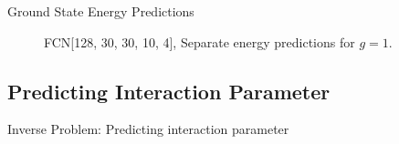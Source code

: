 \documentclass{beamer}
\begin{document}
\begin{frame}{Ground State Energy Predictions}

\begin{figure}[H]
    \centering
    \begin{subfigure}[t]{0.45\textwidth}
		\centering
        
		\label{fig:a}
    \end{subfigure}
    \begin{subfigure}[t]{0.45\textwidth}
		\centering
        
		\label{fig:b}
    \end{subfigure}    
    \begin{subfigure}[t]{0.45\textwidth}
        \centering
        
		\label{fig:c}
    \end{subfigure}
    \begin{subfigure}[t]{0.45\textwidth}
        \centering
        
		\label{fig:c}
    \end{subfigure}
	\caption{FCN[128, 30, 30, 10, 4], Separate energy predictions for $g = 1$.}
\label{fig:FFN-g-1-S}
\end{figure}
\end{frame}

\subsection{Predicting Interaction Parameter}
\begin{frame}{Inverse Problem: Predicting interaction parameter}

\begin{figure}[H]
    \centering
    \begin{subfigure}[t]{0.45\textwidth}
		\centering
    	
		\label{fig:a}
    \end{subfigure}
    \begin{subfigure}[t]{0.45\textwidth}
        \centering
    	
		\label{fig:b}
    \end{subfigure}
    \begin{subfigure}[t]{0.45\textwidth}
        \centering
		
		\label{fig:c}
    \end{subfigure}
    \begin{subfigure}[t]{0.45\textwidth}
        \centering
		
		\label{fig:d}
    \end{subfigure}
\end{figure}
\end{frame}
\end{document}
